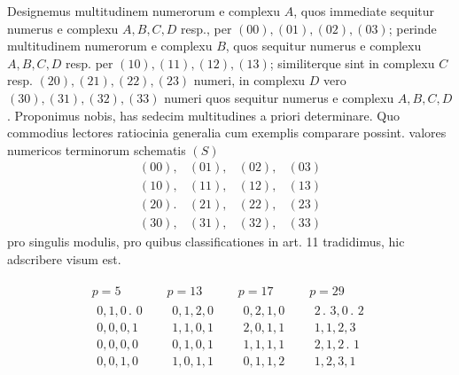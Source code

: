 Designemus multitudinem numerorum e complexu $A$, quos immediate sequitur numerus e complexu $A,B,C,D$ resp., per $(00),(01),(02),(03)$; perinde multitudinem numerorum e complexu $B$, quos sequitur numerus e complexu $A,B,C,D$ resp. per $(10),(11),(12),(13)$; similiterque sint in complexu $C$ resp. $(20),(21),(22),(23)$ numeri, in complexu $D$ vero $(30),(31),(32),(33)$ numeri quos sequitur numerus e complexu $A,B,C,D$. Proponimus nobis, has sedecim multitudines a priori determinare. Quo commodius lectores ratiocinia generalia cum exemplis comparare possint. valores numericos terminorum schematis $(S)$
\[
\begin{array}{llll}
(00),&(01),&(02),&(03)\\
(10),&(11),&(12),&(13)\\
(20).&(21),&(22),&(23)\\
(30),&(31),&(32),&(33)
\end{array}
\]
pro singulis modulis, pro quibus classificationes in art. 11 tradidimus, hic adscribere visum est.

\[
\begin{array}{c|c|c|c}
\begin{gathered}
p=5\\[3pt]
\begin{array}{l}
0,1,0\mathpunct{.}\,0\\
0,0,0,1\\
0,0,0,0\\
0,0,1,0
\end{array}
\end{gathered}&
\begin{gathered}
p=13\\[3pt]
\begin{array}{l}
0,1,2,0\\
1,1,0,1\\
0,1,0,1\\
1,0,1,1
\end{array}
\end{gathered}&
\begin{gathered}
p=17\\[3pt]
\begin{array}{l}
0,2,1,0\\
2,0,1,1\\
1,1,1,1\\
0,1,1,2
\end{array}
\end{gathered}&
\begin{gathered}
p=29\\[3pt]
\begin{array}{l}
2\mathpunct{.}\,3,0\mathpunct{.}\,2\\
1,1,2,3\\
2,1,2\mathpunct{.}\,1\\
1,2,3,1
\end{array}
\end{gathered}
\end{array}
\]

